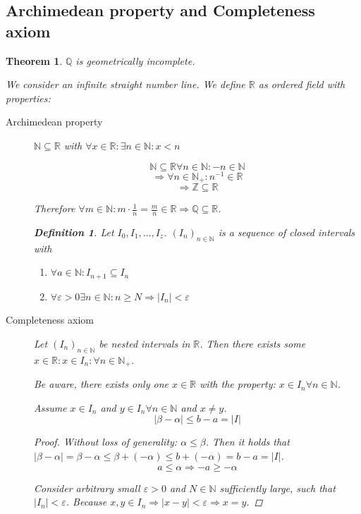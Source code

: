 \documentclass[a4paper,landscape,twocolumn]{article}
\newtheorem{theorem}{Theorem}
\newtheorem{defi}{Definition}
\newcommand\abs[1]{\left|#1\right|}
\begin{document}
\subsection{Archimedean property and Completeness axiom}
\begin{theorem}
  $\mathbb Q$ is geometrically incomplete.

  We consider an infinite straight number line.
  We define $\mathbb R$ as ordered field with properties:
  \begin{description}
    \item[Archimedean property]
      $\mathbb N \subseteq \mathbb R$ with $\forall x \in \mathbb R: \exists n \in \mathbb N: x < n$

      \[ \mathbb N \subseteq \mathbb R \forall n \in \mathbb N: -n \in \mathbb N \]
      \[ \Rightarrow \forall n \in \mathbb N_+: n^{-1} \in \mathbb R \]
      \[ \Rightarrow \mathbb Z \subseteq \mathbb R \]

      Therefore $\forall m \in \mathbb N: m \cdot \frac1n = \frac mn \in \mathbb R
      \Rightarrow \mathbb Q \subseteq \mathbb R$.

      \begin{defi}
        Let $I_0, I_1, \dots, I_z$. $(I_n)_{n \in \mathbb N}$ is a sequence of closed intervals with
        \begin{enumerate}
          \item $\forall a \in \mathbb N: I_{n+1} \subseteq I_n$
          \item $\forall \varepsilon > 0 \exists n \in \mathbb N: n \geq N \Rightarrow \abs{I_n} < \varepsilon$
        \end{enumerate}
      \end{defi}

    \item[Completeness axiom]
      Let $(I_n)_{n \in \mathbb N}$ be nested intervals in $\mathbb R$.
      Then there exists some $x \in \mathbb R: x \in I_n: \forall n \in \mathbb N_+$.

      Be aware, there exists only \emph{one} $x \in \mathbb R$ with the property:
      $x \in I_n \forall n \in \mathbb N$.

      Assume $x \in I_n$ and $y \in I_n \forall n \in \mathbb N$ and $x \neq y$.
      \[ \abs{\beta - \alpha} \leq b - a = \abs{I} \]

      \begin{proof}
        Without loss of generality: $\alpha \leq \beta$.
        Then it holds that $\abs{\beta - \alpha} = \beta - \alpha \leq \beta
        + (-\alpha) \leq b + (-\alpha) = b - a = \abs{I}$.
        \[ a \leq \alpha \Rightarrow -a \geq -\alpha \]

        Consider arbitrary small $\varepsilon > 0$ and $N \in \mathbb N$ sufficiently large,
        such that $\abs{I_n} < \varepsilon$. Because $x,y \in I_n \Rightarrow
        \abs{x - y} < \varepsilon \Rightarrow x = y$.
      \end{proof}
  \end{description}
\end{theorem}
\end{document}

